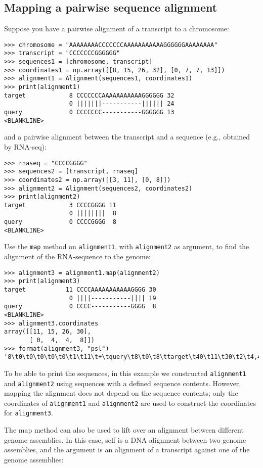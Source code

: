 \subsection{Mapping a pairwise sequence alignment}

Suppose you have a pairwise alignment of a transcript to a chromosome:
\begin{verbatim}
>>> chromosome = "AAAAAAAACCCCCCCAAAAAAAAAAAGGGGGGAAAAAAAA"
>>> transcript = "CCCCCCCGGGGGG"
>>> sequences1 = [chromosome, transcript]
>>> coordinates1 = np.array([[8, 15, 26, 32], [0, 7, 7, 13]])
>>> alignment1 = Alignment(sequences1, coordinates1)
>>> print(alignment1)
target            8 CCCCCCCAAAAAAAAAAAGGGGGG 32
                  0 |||||||-----------|||||| 24
query             0 CCCCCCC-----------GGGGGG 13
<BLANKLINE>
\end{verbatim}
and a pairwise alignment between the transcript and a sequence (e.g., obtained by RNA-seq):
\begin{verbatim}
>>> rnaseq = "CCCCGGGG"
>>> sequences2 = [transcript, rnaseq]
>>> coordinates2 = np.array([[3, 11], [0, 8]])
>>> alignment2 = Alignment(sequences2, coordinates2)
>>> print(alignment2)
target            3 CCCCGGGG 11
                  0 ||||||||  8
query             0 CCCCGGGG  8
<BLANKLINE>
\end{verbatim}
Use the \verb|map| method on \verb|alignment1|, with \verb|alignment2| as argument, to find the alignment of the RNA-sequence to the genome:
\begin{verbatim}
>>> alignment3 = alignment1.map(alignment2)
>>> print(alignment3)
target           11 CCCCAAAAAAAAAAAGGGG 30
                  0 ||||-----------|||| 19
query             0 CCCC-----------GGGG  8
<BLANKLINE>
>>> alignment3.coordinates
array([[11, 15, 26, 30],
       [ 0,  4,  4,  8]])
>>> format(alignment3, "psl")
'8\t0\t0\t0\t0\t0\t1\t11\t+\tquery\t8\t0\t8\ttarget\t40\t11\t30\t2\t4,4,\t0,4,\t11,26,\n'
\end{verbatim}
To be able to print the sequences, in this example  we constructed \verb|alignment1| and \verb|alignment2| using sequences with a defined sequence contents.
However, mapping the alignment does not depend on the sequence contents; only the coordinates of \verb|alignment1| and \verb|alignment2| are used to construct the coordinates for \verb|alignment3|.

The map method can also be used to lift over an alignment between different genome assemblies. In this case, self is a DNA alignment between two genome assemblies, and the argument is an alignment of a transcript against one of the genome assemblies:

